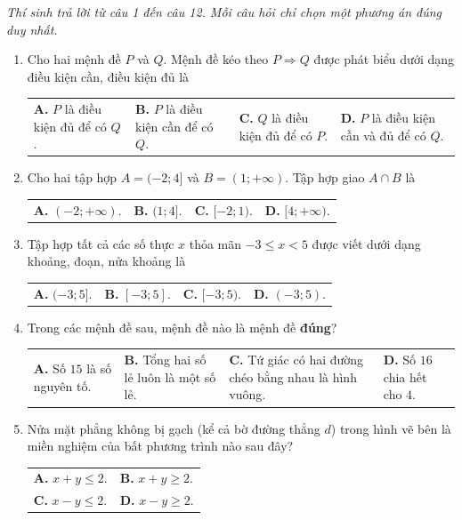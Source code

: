 \documentclass[12pt,a4paper]{article}
\makeatletter
\newcommand{\parttitle}[1]{\par\vspace{1.5pt}{\large\bfseries\color{ink}#1}\par\vspace{1pt}}
\newcommand{\four}[4]{\par\noindent\begin{tabularx}{\linewidth}{@{}*{4}{>{\raggedright\arraybackslash}X}@{}}\textbf{A.} #1&\textbf{B.} #2&\textbf{C.} #3&\textbf{D.} #4\end{tabularx}}
\newcommand{\two}[4]{\par\noindent\begin{tabularx}{\linewidth}{@{}*{2}{>{\raggedright\arraybackslash}X}@{}}\textbf{A.} #1&\textbf{B.} #2\\[2pt]\textbf{C.} #3&\textbf{D.} #4\end{tabularx}}
\makeatother
\begin{document}
\enlargethispage{1.8\baselineskip}
\parttitle{PHẦN I. Trắc nghiệm nhiều lựa chọn}
\textit{Thí sinh trả lời từ câu 1 đến câu 12. Mỗi câu hỏi chỉ chọn một phương án đúng duy nhất.}
\begin{enumerate}
\item Cho hai mệnh đề $P$ và $Q$. Mệnh đề kéo theo $P \Rightarrow Q$ được phát biểu dưới dạng điều kiện cần, điều kiện đủ là
\four{$P$ là điều kiện đủ để có $Q$.}{$P$ là điều kiện cần để có $Q$.}{$Q$ là điều kiện đủ để có $P$.}{$P$ là điều kiện cần và đủ để có $Q$.}

\item Cho hai tập hợp $A = (-2; 4]$ và $B = (1; +\infty)$. Tập hợp giao $A \cap B$ là
\four{$(-2; +\infty)$.}{$(1; 4]$.}{$[-2; 1)$.}{$[4; +\infty)$.}

\item Tập hợp tất cả các số thực $x$ thỏa mãn $-3 \le x < 5$ được viết dưới dạng khoảng, đoạn, nửa khoảng là
\four{$(-3; 5]$.}{$[-3; 5]$.}{$[-3; 5)$.}{$(-3; 5)$.}

\item Trong các mệnh đề sau, mệnh đề nào là mệnh đề \textbf{đúng}?
\four{Số $15$ là số nguyên tố.}{Tổng hai số lẻ luôn là một số lẻ.}{Tứ giác có hai đường chéo bằng nhau là hình vuông.}{Số $16$ chia hết cho $4$.}

\item \begin{minipage}[t]{0.70\linewidth}
Nửa mặt phẳng không bị gạch (kể cả bờ đường thẳng $d$) trong hình vẽ bên là miền nghiệm của bất phương trình nào sau đây?
\two{$x + y \le 2$.}{$x + y \ge 2$.}{$x - y \le 2$.}{$x - y \ge 2$.}
\end{minipage}%
\hfill
\begin{minipage}[t]{0.28\linewidth}
\centering
{}
\end{minipage}


\end{enumerate}
\end{document}
